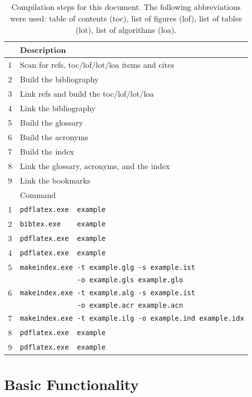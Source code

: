 \begin{table}
	\centering
	\begin{tabular}{rl}
		\toprule
		& Description \\
		\midrule
		1 & Scan for refs, toc/lof/lot/loa items and cites \\
		2 & Build the bibliography     \\
		3 & Link refs and build the toc/lof/lot/loa \\
		4 & Link the bibliography \\
		5 & Build the glossary \\
		6 & Build the acronyms \\
		7 & Build the index \\
		8 & Link the glossary, acronyms, and the index \\
		9 & Link the bookmarks \\
		\midrule
		& Command \\
		\midrule
		1 & \verb|pdflatex.exe  example| \\
		2 & \verb|bibtex.exe    example| \\
		3 & \verb|pdflatex.exe  example| \\
		4 & \verb|pdflatex.exe  example| \\
		5 & \verb|makeindex.exe -t example.glg -s example.ist| \\ 
		  & \verb|              -o example.gls example.glo| \\
		6 & \verb|makeindex.exe -t example.alg -s example.ist| \\
		  & \verb|              -o example.acr example.acn| \\
		7 & \verb|makeindex.exe -t example.ilg -o example.ind example.idx| \\
		8 & \verb|pdflatex.exe  example| \\
		9 & \verb|pdflatex.exe  example| \\
		\bottomrule
	\end{tabular}
	\caption{Compilation steps for this document. The following abbreviations were used: table of contents (toc), list of figures (lof), list of tables (lot), list of algorithms (loa).}
	\label{tab:compile} %
\end{table}


\section{Basic Functionality}

